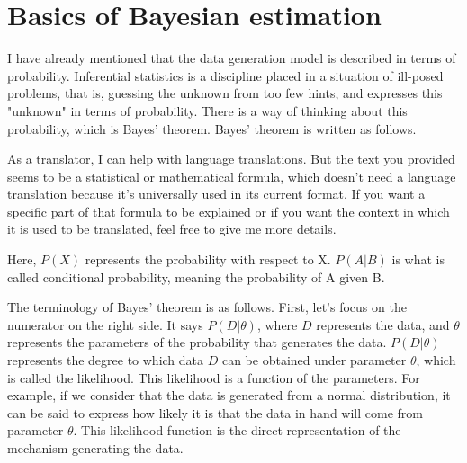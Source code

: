 \documentclass{ltjsbook}
\begin{document}
\section{Basics of Bayesian estimation}

I have already mentioned that the data generation model is described in terms of probability. Inferential statistics is a discipline placed in a situation of ill-posed problems, that is, guessing the unknown from too few hints, and expresses this "unknown" in terms of probability. There is a way of thinking about this probability, which is Bayes' theorem. Bayes' theorem is written as follows.

As a translator, I can help with language translations. But the text you provided seems to be a statistical or mathematical formula, which doesn't need a language translation because it's universally used in its current format. If you want a specific part of that formula to be explained or if you want the context in which it is used to be translated, feel free to give me more details.

Here, $P(X)$ represents the probability with respect to X. $P(A|B)$ is what is called conditional probability, meaning the probability of A given B.

The terminology of Bayes' theorem is as follows. First, let's focus on the numerator on the right side. It says $P(D| \theta)$, where $D$ represents the data, and $\theta$ represents the parameters of the probability that generates the data. $P(D|\theta)$ represents the degree to which data $D$ can be obtained under parameter $\theta$, which is called the likelihood. This likelihood is a function of the parameters. For example, if we consider that the data is generated from a normal distribution, it can be said to express how likely it is that the data in hand will come from parameter $\theta$. This likelihood function is the direct representation of the mechanism generating the data.
\end{document}
